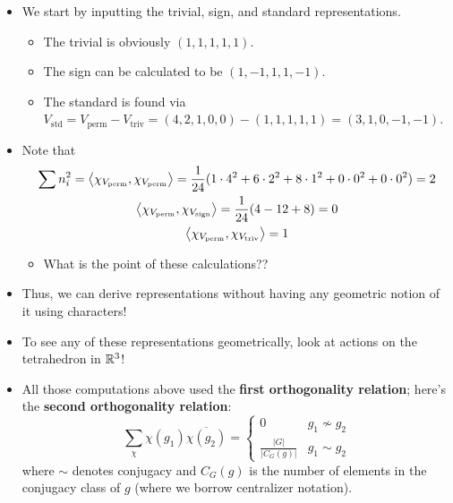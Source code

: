\documentclass[../notes.tex]{subfiles}
\begin{document}
\begin{itemize}
\begin{itemize}
\begin{itemize}
        \end{itemize}
        \item We start by inputting the trivial, sign, and standard representations.
        \begin{itemize}
            \item The trivial is obviously $(1,1,1,1,1)$.
            \item The sign can be calculated to be $(1,-1,1,1,-1)$.
            \item The standard is found via $V_\text{std}=V_\text{perm}-V_\text{triv}=(4,2,1,0,0)-(1,1,1,1,1)=(3,1,0,-1,-1)$.
        \end{itemize}
        \item Note that
        \begin{gather*}
            \sum n_i^2 = \left\langle{\chi_{V_\text{perm}},\chi_{V_\text{perm}}}\right\rangle
                = \frac{1}{24}(1\cdot 4^2+6\cdot 2^2+8\cdot 1^2+0\cdot 0^2+0\cdot 0^2)
                = 2\\
            \left\langle{\chi_{V_\text{perm}},\chi_{V_\text{sign}}}\right\rangle = \frac{1}{24}(4-12+8)
                = 0\\
            \left\langle{\chi_{V_\text{perm}},\chi_{V_\text{triv}}}\right\rangle = 1
        \end{gather*}
        \begin{itemize}
            \item What is the point of these calculations??
        \end{itemize}
        \item Thus, we can derive representations without having any geometric notion of it using characters!
        \item To see any of these representations geometrically, look at actions on the tetrahedron in $\mathbb{R}^3$!
        \item All those computations above used the \textbf{first orthogonality relation}; here's the \textbf{second orthogonality relation}:
        \begin{equation*}
            \sum_\chi\chi(g_1)\overline{\chi(g_2)} =
            \begin{cases}
                0 & g_1\nsim g_2\\
                \frac{|G|}{|C_G(g)|} & g_1\sim g_2
            \end{cases}
        \end{equation*}
        where $\sim$ denotes conjugacy and $C_G(g)$ is the number of elements in the conjugacy class of $g$ (where we borrow centralizer notation).

\end{itemize}
\end{itemize}
\end{document}
